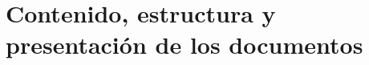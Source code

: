 \section[Contenido, estructura y presentación]{Contenido, estructura y presentación de los documentos} \label{ss:separac} 


